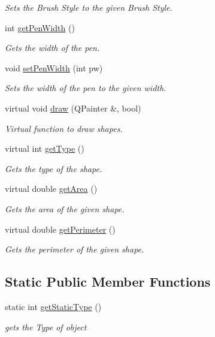 \begin{DoxyCompactItemize}
\begin{DoxyCompactList}\small\item\em Sets the Brush Style to the given Brush Style. \end{DoxyCompactList}\item 
int \hyperlink{classRectangle_a45243b7fbe88527e6aed399b37863305}{get\+Pen\+Width} ()
\begin{DoxyCompactList}\small\item\em Gets the width of the pen. \end{DoxyCompactList}\item 
void \hyperlink{classRectangle_aa4e06745d54628776b1ac0f85c1e9867}{set\+Pen\+Width} (int pw)
\begin{DoxyCompactList}\small\item\em Sets the width of the pen to the given width. \end{DoxyCompactList}\item 
virtual void \hyperlink{classRectangle_a6734cad19e207a212dcb042e1006a7f1}{draw} (Q\+Painter \&, bool)
\begin{DoxyCompactList}\small\item\em Virtual function to draw shapes. \end{DoxyCompactList}\item 
virtual int \hyperlink{classRectangle_a0098e1642c4ff1180c1243b802caca5a}{get\+Type} ()
\begin{DoxyCompactList}\small\item\em Gets the type of the shape. \end{DoxyCompactList}\item 
virtual double \hyperlink{classRectangle_a5405044e619a5ba1a52c0b9607c9f166}{get\+Area} ()
\begin{DoxyCompactList}\small\item\em Gets the area of the given shape. \end{DoxyCompactList}\item 
virtual double \hyperlink{classRectangle_aba6936b3c376465edff938cd4affc914}{get\+Perimeter} ()
\begin{DoxyCompactList}\small\item\em Gets the perimeter of the given shape. \end{DoxyCompactList}\end{DoxyCompactItemize}
\subsection*{Static Public Member Functions}
\begin{DoxyCompactItemize}
\item 
static int \hyperlink{classRectangle_ac9e18cf57224bfbc584547c0ee6d1ce3}{get\+Static\+Type} ()
\begin{DoxyCompactList}\small\item\em gets the Type of object \end{DoxyCompactList}\end{DoxyCompactItemize}


